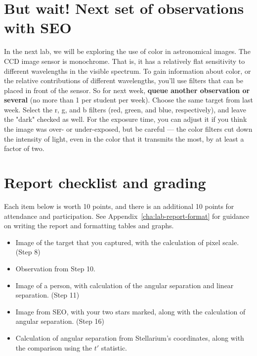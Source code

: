 \section{But wait! Next set of observations with SEO}

In the next lab, we will be exploring the use of color in astronomical images. The CCD image sensor is monochrome. That is, it has a relatively flat sensitivity to different wavelengths in the visible spectrum. To gain information about color, or the relative contributions of different wavelengths, you'll use filters that can be placed in front of the sensor. So for next week, \textbf{queue another observation or several} (no more than 1 per student per week). Choose the same target from last week. Select the r, g, and b filters (red, green, and blue, respectively), and leave the "dark" checked as well. For the exposure time, you can adjust it if you think the image was over- or under-exposed, but be careful --- the color filters cut down the intensity of light, even in the color that it transmits the most, by at least a factor of two.

\section{Report checklist and grading}

Each item below is worth 10 points, and there is an additional 10 points for attendance and participation. See Appendix\ \ref{cha:lab-report-format} for guidance on writing the report and formatting tables and graphs.

\begin{itemize}
	
	\item Image of the target that you captured, with the calculation of pixel scale. (Step 8)
	
	\item Observation from Step 10.
	
	\item Image of a person, with calculation of the angular separation and linear separation. (Step 11)
	
	\item Image from SEO, with your two stars marked, along with the calculation of angular separation. (Step 16)
	
	\item Calculation of angular separation from Stellarium's coordinates, along with the comparison using the $t'$ statistic.
	
\end{itemize}